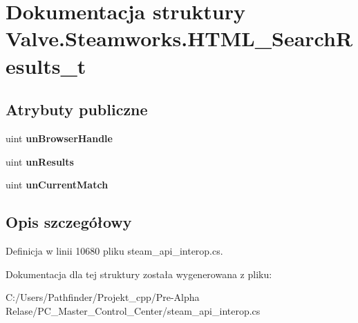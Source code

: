 \hypertarget{struct_valve_1_1_steamworks_1_1_h_t_m_l___search_results__t}{}\section{Dokumentacja struktury Valve.\+Steamworks.\+H\+T\+M\+L\+\_\+\+Search\+Results\+\_\+t}
\label{struct_valve_1_1_steamworks_1_1_h_t_m_l___search_results__t}
\subsection*{Atrybuty publiczne}
\begin{DoxyCompactItemize}
\item 
\mbox{\label{struct_valve_1_1_steamworks_1_1_h_t_m_l___search_results__t_a734d74e2429574118173bdd3381901ad}} 
uint {\bfseries un\+Browser\+Handle}
\item 
\mbox{\label{struct_valve_1_1_steamworks_1_1_h_t_m_l___search_results__t_a3b367341041e2b1014a4ce43e2a52130}} 
uint {\bfseries un\+Results}
\item 
\mbox{\label{struct_valve_1_1_steamworks_1_1_h_t_m_l___search_results__t_af27e10a4212e45919cf622c2564fc309}} 
uint {\bfseries un\+Current\+Match}
\end{DoxyCompactItemize}


\subsection{Opis szczegółowy}


Definicja w linii 10680 pliku steam\+\_\+api\+\_\+interop.\+cs.



Dokumentacja dla tej struktury została wygenerowana z pliku\+:\begin{DoxyCompactItemize}
\item 
C\+:/\+Users/\+Pathfinder/\+Projekt\+\_\+cpp/\+Pre-\/\+Alpha Relase/\+P\+C\+\_\+\+Master\+\_\+\+Control\+\_\+\+Center/steam\+\_\+api\+\_\+interop.\+cs\end{DoxyCompactItemize}
